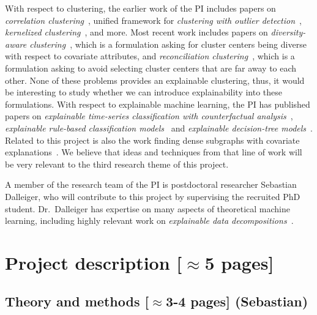 \documentclass[a4paper,11pt]{article}
\begin{document}
With respect to clustering, 
the earlier work of the PI includes papers on
\emph{correlation clustering}~\cite{bonchi2013overlapping,gionis2007clustering},
unified framework for \emph{clustering with outlier detection}~\cite{chawla2013k},
\emph{kernelized clustering}~\cite{amid2015kernel}, and more.
Most recent work includes papers on
\emph{diversity-aware clustering}~\cite{thejaswi2021diversity}, 
which is a formulation asking for cluster centers being diverse with respect to covariate attributes, and
\emph{reconciliation clustering}~\cite{spoerhase2023constant}, 
which is a formulation asking to avoid selecting cluster centers that are far away to each other.
None of these problems provides an explainable clustering, 
thus, it would be interesting to study whether we can introduce explainability
into these formulations.
%
With respect to explainable machine learning, 
the PI has published papers on 
\emph{explainable time-series classification with counterfactual analysis}~\cite{karlsson2020locally},
\emph{explainable rule-based classification models}~\cite{ciaperoni2023concise,zhang2020diverse}
and 
\emph{explainable decision-tree models}~\cite{zhang2023regularized}. 
Related to this project is also the work
finding dense subgraphs with covariate explanations~\cite{galbrun2014overlapping,galbrun2016top}.
We believe that ideas and techniques from that line of work
will be very relevant to the third research theme of this project.

A member of the research team of the PI is postdoctoral researcher Sebastian Dalleiger, 
who will contribute to this project by supervising the recruited PhD student.
Dr.\ Dalleiger has expertise on many aspects of theoretical machine learning, 
including highly relevant work on \emph{explainable data decompositions}~\cite{dalleiger2020explainable}.

\section{Project description {\color{orange}[$\approx$5 pages]}}


\subsection{Theory and methods {\color{orange}[$\approx$3-4 pages]} {\color{teal}(Sebastian)}}

\end{document}
